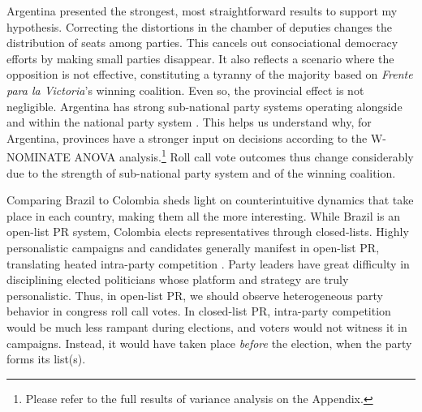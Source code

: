 \documentclass[a4paper,12pt]{article}
\begin{document}
Argentina presented the strongest, most straightforward results to support my hypothesis. Correcting the distortions in the chamber of deputies changes the distribution of seats among parties. This cancels out consociational democracy efforts by making small parties disappear. It also reflects a scenario where the opposition is not effective, constituting a tyranny of the majority based on \textit{Frente para la Victoria}'s winning coalition. Even so, the provincial effect is not negligible. Argentina has strong sub-national party systems operating alongside and within the national party system \citep{gibson2010federalized}. %
This helps us understand why, for Argentina, provinces have a stronger input on decisions according to the W-NOMINATE ANOVA analysis.\footnote{Please refer to the full results of variance analysis on the Appendix.} %
Roll call vote outcomes thus change considerably due to the strength of sub-national party system and of the winning coalition.


Comparing Brazil to Colombia sheds light on counterintuitive dynamics that take place in each country, making them all the more interesting. %
While Brazil is an open-list PR system, Colombia elects representatives through closed-lists. Highly personalistic campaigns and candidates generally manifest in open-list PR, translating heated intra-party competition \citep{mershon2020challenging}. Party leaders have great difficulty in disciplining elected politicians whose platform and strategy are truly personalistic. Thus, in open-list PR, we should observe heterogeneous party behavior in congress roll call votes. In closed-list PR, intra-party competition would be much less rampant during elections, and voters would not witness it in campaigns. Instead, it would have taken place \textit{before} the election, when the party forms its list(s).
\end{document}
